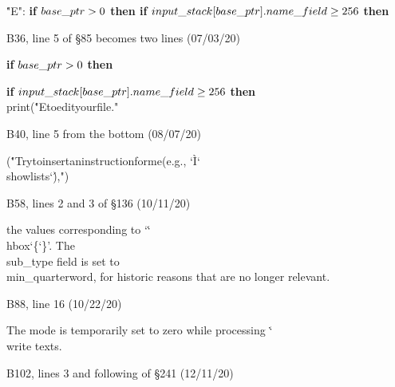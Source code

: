 \ninepoint\noindent\quad
\.{"E"}: {\bf if} $\\{base\_ptr}>0$ {\bf then if}
 $\\{input\_stack}[\\{base\_ptr}].\\{name\_field}\ge256$ {\bf then}

\bugonpage B36, line 5 of \S85 becomes two lines (07/03/20)

\ninepoint\noindent\quad
{\bf if} $\\{base\_ptr}>0$ {\bf then}\par
\noindent\qquad
{\bf if} $\\{input\_stack}[\\{base\_ptr}].\\{name\_field}\ge256$ {\bf then}
\\{print}(\.{"E\]to\]edit\]your\]file."}

\bugonpage B40, line 5 from the bottom (08/07/20)

\ninepoint\noindent\qquad
(\.{"Try\]to\]insert\]an\]instruction\]for\]me\](e.g.,\]%
        \char`\`I\char`\\showlists\char`\'),"})

\bugonpage B58, lines 2 and 3 of \S136 (10/11/20)

\tenpoint\noindent
the values corresponding to `\.{\char`\\hbox\char`\{\char`\}}'.
The \\{sub\_type} 
field is set to \\{min\_quarterword}, for historic reasons that are no
longer relevant.

\bugonpage B88, line 16 (10/22/20)

\tenpoint\noindent
The mode is temporarily set to zero while processing \.{\char`\\write} texts.

\bugonpage B102, lines 3 and following of \S241 (12/11/20)

